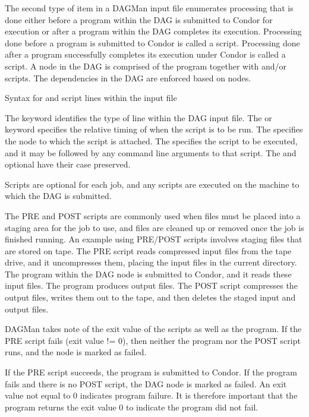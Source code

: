The second type of item in a DAGMan input file enumerates
processing that is done either before a program within
the DAG is submitted to Condor for execution
or after
a program within
the DAG completes its execution.
Processing done before a program is submitted to Condor is
called a  script.
Processing done after a program successfully completes
its execution under Condor is
called a  script.
A node in the DAG is comprised of the program together with
 and/or  scripts.
The dependencies in the DAG are enforced based on nodes.

Syntax for  and  script lines within the input file

    

     

The  keyword identifies the type of line within
the DAG input file.
The  or  keyword
specifies the relative timing of when the script is to be run.
The  specifies the node to which the script is attached.
The 
specifies the script to be executed, and it
may be followed by any command line arguments to that script.
The  and optional  have their
case preserved.

Scripts are optional for each job, and
any scripts are executed on the machine
to which the DAG is submitted.

The PRE and POST scripts are commonly used
when files must be placed into a staging area for the job to use,
and files are cleaned up or removed once the job is finished running.
An example using PRE/POST scripts involves staging files
that are stored on tape.
The PRE script reads compressed input files from the tape drive,
and it uncompresses them, placing the input files in the current directory.
The program within the DAG node is submitted to Condor,
and it reads these input files.
The program produces output files.
The POST script compresses the output files, writes them out to
the tape, and then deletes the staged input and output files.

DAGMan takes note of the exit value of the
scripts as well as the program.
If the PRE script fails (exit value != 0), then neither the program nor
the POST script runs, and the node is marked as failed.

If the PRE script succeeds, the program is submitted to Condor. 
If the program fails and there is no POST script,
the DAG node is marked as failed.
An exit value not equal to 0 indicates program failure.
It is therefore important that the program returns the exit
value 0 to indicate the program did not fail.

